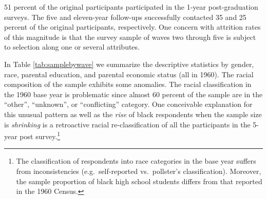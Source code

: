 \documentclass[onehalfspacing,11pt]{article}
\begin{document}
51 percent of the original participants participated in the 1-year post-graduation surveys. The five and eleven-year follow-ups successfully contacted 35 and 25 percent of the original participants, respectively. One concern with attrition rates of this magnitude is that the survey sample of waves two through five is subject to selection along one or several attributes.

In Table \ref{tab:samplebywave} we summarize the descriptive statistics by gender, race, parental education, and parental economic status (all in 1960). The racial composition of the sample exhibits some anomalies. The racial classification in the 1960 base year is problematic since almost 60 percent of the sample are in the ``other'', ``unknown'', or ``conflicting'' category. One conceivable explanation for this unusual pattern as well as the {\it rise} of black respondents when the sample size is {\it shrinking} is a retroactive racial re-classification of all the participants in the 5-year post survey.\footnote{The classification of respondents into race categories in the base year suffers from inconsistencies (e.g.~self-reported vs.~pollster's classification). Moreover, the sample proportion of black high school students differs from that reported in the 1960 Census.} %
\end{document}
